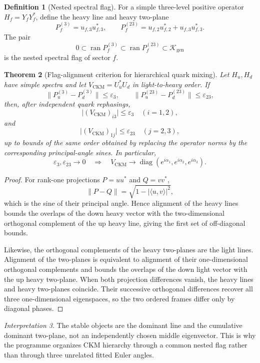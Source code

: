 \documentclass[11pt,oneside,openany]{book}
\numberwithin{equation}{chapter}
\newtheorem{theorem}{Theorem}[chapter]
\theoremstyle{definition}
\newtheorem{definition}[theorem]{Definition}
\theoremstyle{remark}
\newtheorem{interpretation}[theorem]{Interpretation}
\newcommand{\diag}{\operatorname{diag}}
\newcommand{\Kgen}{\mathcal K_{\mathrm{gen}}}
\newcommand{\norm}[1]{\lVert #1\rVert}
\newcommand{\abs}[1]{\lvert #1\rvert}
\newcommand{\ip}[2]{\langle #1,#2\rangle}
\newcommand{\CKM}{\mathrm{CKM}}
\begin{document}
\begin{definition}[Nested spectral flag]
For a simple three-level positive operator \(H_f=Y_fY_f^*\), define the
heavy line and heavy two-plane
\[
 P_f^{(3)}=u_{f,3}u_{f,3}^*,
 \qquad
 P_f^{(23)}
 =u_{f,2}u_{f,2}^*+u_{f,3}u_{f,3}^*.
\]
The pair
\[
 0\subset\operatorname{ran}P_f^{(3)}
 \subset\operatorname{ran}P_f^{(23)}
 \subset\Kgen
\]
is the nested spectral flag of sector \(f\).
\end{definition}

\begin{theorem}[Flag-alignment criterion for hierarchical quark mixing]
\label{thm:flag-alignment-ckm}
Let \(H_u,H_d\) have simple spectra and let \(V_{\CKM}=U_u^*U_d\) in
light-to-heavy order.  If
\[
 \norm{P_u^{(3)}-P_d^{(3)}}\le\varepsilon_3,
 \qquad
 \norm{P_u^{(23)}-P_d^{(23)}}\le\varepsilon_{23},
\]
then, after independent quark rephasings,
\[
 \abs{(V_{\CKM})_{i3}}
 \le \varepsilon_3
 \quad(i=1,2),
\]
and
\[
 \abs{(V_{\CKM})_{1j}}
 \le \varepsilon_{23}
 \quad(j=2,3),
\]
up to bounds of the same order obtained by replacing the operator norms by
the corresponding principal-angle sines.  In particular,
\[
 \varepsilon_3,\varepsilon_{23}\longrightarrow0
 \quad\Longrightarrow\quad
 V_{\CKM}\longrightarrow
 \diag(e^{i\alpha_1},e^{i\alpha_2},e^{i\alpha_3}).
\]
\end{theorem}

\begin{proof}
For rank-one projections \(P=uu^*\) and \(Q=vv^*\),
\[
 \norm{P-Q}
 =\sqrt{1-\abs{\ip{u}{v}}^2},
\]
which is the sine of their principal angle.  Hence alignment of the heavy
lines bounds the overlaps of the down heavy vector with the two-dimensional
orthogonal complement of the up heavy line, giving the first set of
off-diagonal bounds.

Likewise, the orthogonal complements of the heavy two-planes are the light
lines.  Alignment of the two-planes is equivalent to alignment of their
one-dimensional orthogonal complements and bounds the overlaps of the down
light vector with the up heavy two-plane.  When both projection differences
vanish, the heavy lines and heavy two-planes coincide.  Their successive
orthogonal differences recover all three one-dimensional eigenspaces, so
the two ordered frames differ only by diagonal phases.
\end{proof}

\begin{interpretation}
The stable objects are the dominant line and the cumulative dominant
two-plane, not an independently chosen middle eigenvector.  This is why the
programme organizes CKM hierarchy through a common nested flag rather than
through three unrelated fitted Euler angles.
\end{interpretation}
\end{document}
